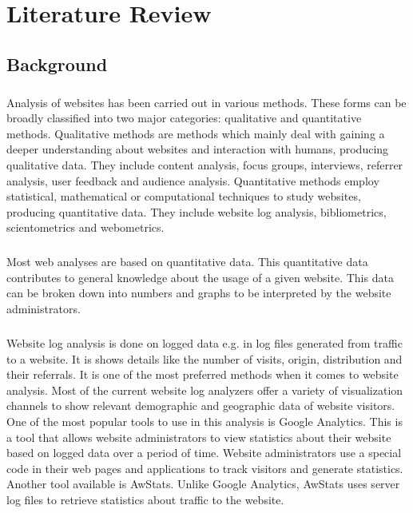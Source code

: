 \chapter{Literature Review}
\section{Background}
\paragraph{}
Analysis of websites has been carried out in various methods. These forms can be broadly classified into two major categories: qualitative and quantitative methods. Qualitative methods are methods which mainly deal with gaining a deeper understanding about websites and interaction with humans, producing qualitative data. They include content analysis, focus groups, interviews, referrer analysis, user feedback and audience analysis. Quantitative methods employ statistical, mathematical or computational techniques to study websites, producing quantitative data. They include website log analysis, bibliometrics, scientometrics and webometrics.
\paragraph{}
Most web analyses are based on quantitative data. This quantitative data contributes to general knowledge about the usage of a given website. This data can be broken down into numbers and graphs to be interpreted by the website administrators. 
\paragraph{}
Website log analysis is done on logged data e.g. in log files generated from traffic to a website. It is shows details like the number of visits, origin, distribution and their referrals. It is one of the most preferred methods when it comes to website analysis. Most of the current website log analyzers offer a variety of visualization channels to show relevant demographic and geographic data of website visitors. One of the most popular tools to use in this analysis is Google Analytics. This is a tool that allows website administrators to view statistics about their website based on logged data over a period of time. Website administrators use a special code in their web pages and applications to track visitors and generate statistics. Another tool available is AwStats. Unlike Google Analytics, AwStats uses server log files to retrieve statistics about traffic to the website.
